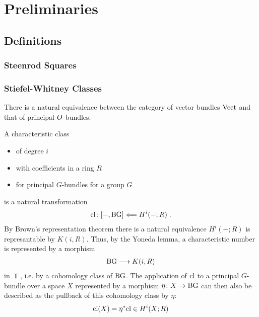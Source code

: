 % 

\chapter{Preliminaries}
\section{Definitions}
\subsection{Steenrod Squares}

\subsection{Stiefel-Whitney Classes}
\begin{Def} %
  There is a natural equivalence between the category of vector
  bundles $\text{Vect}$ and that of principal $O$-bundles.
\end{Def}

\begin{Def}
  A characteristic class
  \begin{itemize}
  \item of degree $i$
  \item with coefficients in a ring $R$
  \item for principal $G$-bundles for a group $G$
  \end{itemize}
  is a natural transformation
  \begin{gather*}
    \text{cl}\colon [-, \text{BG}] \Longleftarrow H^i(-; R)\;.
  \end{gather*}
  By Brown's representation theorem %
  there is a natural equivalence $H^i(-;R)$ is represantable by
  $K(i,R)$. Thus, by the Yoneda lemma, a characteristic number is
  represented by a morphism
  \begin{gather*}
    \text{BG} \longrightarrow K(i, R)
  \end{gather*}
  in $\Top$, i.e. by a cohomology class of $\text{BG}$.
  The application of $\text{cl}$ to a principal $G$-bundle over a
  space $X$ represented by a morphism $\eta\colon X\to\text{BG}$ %
  can then also be described as the pullback of this cohomology class
  by $\eta$:
  \begin{gather*}
    \text{cl}(X) = {\eta}^* \text{cl} \in H^i(X;R)
  \end{gather*}
\end{Def}

